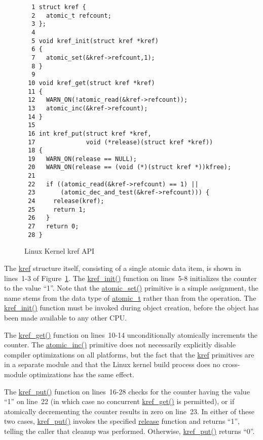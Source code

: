 \begin{figure}[htbp]
{ \scriptsize
\begin{verbatim}
  1 struct kref {
  2   atomic_t refcount;
  3 };
  4 
  5 void kref_init(struct kref *kref)
  6 {
  7   atomic_set(&kref->refcount,1);
  8 }
  9 
 10 void kref_get(struct kref *kref)
 11 {
 12   WARN_ON(!atomic_read(&kref->refcount));
 13   atomic_inc(&kref->refcount);
 14 }
 15 
 16 int kref_put(struct kref *kref,
 17              void (*release)(struct kref *kref))
 18 {
 19   WARN_ON(release == NULL);
 20   WARN_ON(release == (void (*)(struct kref *))kfree);
 21 
 22   if ((atomic_read(&kref->refcount) == 1) ||
 23       (atomic_dec_and_test(&kref->refcount))) {
 24     release(kref);
 25     return 1;
 26   }
 27   return 0;
 28 }
\end{verbatim}
}
\caption{Linux Kernel kref API}
\label{fig:defer:Linux Kernel kref API}
\end{figure}

The \url{kref} structure itself, consisting of a single atomic
data item, is shown in lines~1-3 of
Figure~\ref{fig:defer:Linux Kernel kref API}.
The \url{kref_init()} function on lines~5-8 initializes the counter
to the value ``1''.
Note that the \url{atomic_set()} primitive is a simple
assignment, the name stems from the data type of \url{atomic_t}
rather than from the operation.
The \url{kref_init()} function must be invoked during object creation,
before the object has been made available to any other CPU.

The \url{kref_get()} function on lines~10-14 unconditionally atomically
increments the counter.
The \url{atomic_inc()} primitive does not necessarily explicitly
disable compiler
optimizations on all platforms, but the fact that the \url{kref}
primitives are in a separate module and that the Linux kernel build
process does no cross-module optimizations has the same effect.

The \url{kref_put()} function on lines~16-28 checks for the counter having the
value ``1'' on line~22
(in which case no concurrent \url{kref_get()} is permitted),
or if atomically decrementing the counter results in zero on line~23.
In either of these two cases, \url{kref_put()} invokes the
specified \url{release} function and returns ``1'', telling the
caller that cleanup was performed.
Otherwise, \url{kref_put()} returns ``0''.

 \QuickQuizEnd


